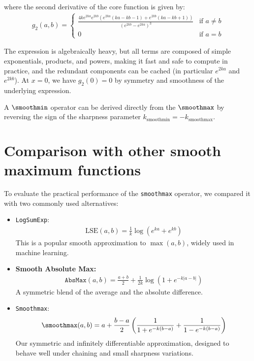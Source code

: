 where the second derivative of the core function is given by:
\begin{align}
    g_2(a, b) = \begin{cases}
        \frac{4ke^{2ka}e^{2kb} \left( e^{2ka} (ka-kb-1) + e^{2kb}(ka - kb + 1) \right)}{\left(e^{2kb}-e^{2ka} \right)^3} &\text{if } a \neq b \\
        0  &\text{if } a = b
    \end{cases}
\end{align}

The expression is algebraically heavy, but all terms are composed of simple exponentials, products, and powers, making it fast and safe to compute in practice, and the redundant components can be cached (in particular $e^{2ka}$ and $e^{2kb}$). At $x = 0$, we have $g_2(0) = 0$ by symmetry and smoothness of the underlying expression.

A $\smoothmin$ operator can be derived directly from the $\smoothmax$ by reversing the sign of the sharpness parameter $k_{\text{smoothmin}} = - k_{\text{smoothmax}}$.



\section{Comparison with other smooth maximum functions}
\label{sec:comparison-smoothmax}

To evaluate the practical performance of the \texttt{smoothmax} operator, we compared it with two commonly used alternatives:

\begin{itemize}
    \item \texttt{LogSumExp}:
    \begin{align}
        \mathrm{LSE}(a, b) = \frac{1}{k} \log\left(e^{k a} + e^{k b}\right)
    \end{align}
    This is a popular smooth approximation to $\max(a, b)$, widely used in machine learning.

    \item \textbf{Smooth Absolute Max:}
    \begin{align}
        \mathrm{\texttt{AbsMax}}(a, b) = \frac{a + b}{2} + \frac{1}{2k} \log\left(1 + e^{-k|a - b|}\right)
    \end{align}
    A symmetric blend of the average and the absolute difference.

    \item \texttt{Smoothmax}:
    \begin{align}
        \smoothmax(a, b) = a + \frac{b - a}{2} \left( \frac{1}{1 + e^{-k(b - a)}} + \frac{1}{1 - e^{-k(b - a)}} \right)
    \end{align}
    Our symmetric and infinitely differentiable approximation, designed to behave well under chaining and small sharpness variations.
\end{itemize}

